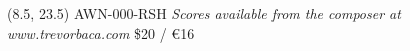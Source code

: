 \documentclass[10pt]{article}
\begin{document}


\begin{textblock}{7.5}(8.5, 23.5)
AWN-000-RSH \hfill
\textit{Scores available from the composer at www.trevorbaca.com} \hfill
\$20 / \euro 16
\end{textblock}
\end{document}
